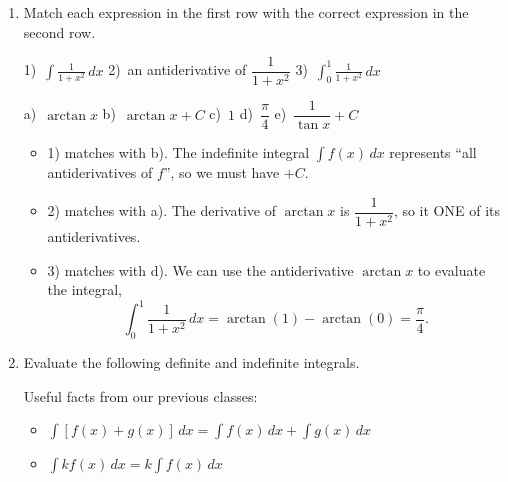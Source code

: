 \documentclass[main]{subfiles}
\begin{document}
\begin{enumerate}[resume,topsep=0pt]

\item Match each expression in the first row with the correct
  expression in the second row. \vspace{-8pt}
  
      \null\hfill
      1)\, $\displaystyle \int \frac{1}{1+x^2}\,dx$
      \hfill
      2)\, an antiderivative of $\dfrac{1}{1+x^2}$
      \hfill
      3)\, $\displaystyle \int_0^1 \frac{1}{1+x^2}\,dx$
      \hfill\null
      
        \hrulefill \vspace{-12pt}
        
      \null\hfill 
      a)\, $\arctan x $
      \hfill
      b)\, $\arctan x + C$
      \hfill
      c)\, $1$
      \hfill
      d)\, $\dfrac{\pi}{4}$ 
      \hfill
      e)\, $\dfrac{1}{\tan x} +C$
      \null\hfill

\begin{solution}
\begin{itemize}
    \item 1) matches with b). The indefinite integral 
    $\displaystyle\int f(x)\,dx$ represents
    ``all antiderivatives of $f$'', so we must have $+C$.
    
    \item 2) matches with a). The derivative of $\arctan x$ is 
    $\dfrac{1}{1+x^2}$, so it ONE of its antiderivatives.
    
    \item 3) matches with d). We can use the antiderivative $\arctan x$
    to evaluate the integral,
    \[
    \int_0^1 \frac{1}{1+x^2}\,dx = \arctan(1)-\arctan(0)=\frac{\pi}{4}.
    \]
\end{itemize}
\end{solution}

\pspace{\newpage}


\item  Evaluate the following definite and indefinite integrals.
\begin{framed}
    Useful facts from our previous classes:
    \begin{itemize}[topsep=0pt]
        \item $\displaystyle \int \left[f(x)+g(x)\right]\,dx =
        \int f(x)\,dx + \int g(x)\,dx$
        \item $\displaystyle \int kf(x)\,dx = k\int f(x)\,dx$
    \end{itemize}
\end{framed}


\end{enumerate}
\end{document}
